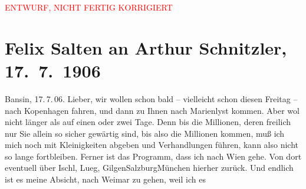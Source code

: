 
\begin{center}
            \textcolor{red}{ENTWURF, NICHT FERTIG KORRIGIERT}
                      \end{center}
            
         
         \renewcommand{\erwaehntePersonen}{Personen: Ottilie Salten, Olga Schnitzler}
         \renewcommand{\erwaehnteOrte}{Orte: Bad Ischl, Bansin, Deutschland, Kopenhagen, Lueg am Wolfgangsee, Marienlyst, München, Salzburg, St. Gilgen, Weimar, Wien}
         \renewcommand{\erwaehnteWerke}{}
               \section[Felix Salten an Arthur Schnitzler, 17. 7. 1906]{ Felix Salten an Arthur Schnitzler, 17. 7. 1906}\nopagebreak{}\rehead{ }\begin{ledgroupsized}[t]{13cm}\normalsize\beginnumbering \toendnotes[C]{\smallbreak\pagebreak[2]} 
\toendnotes[C]{\smallbreak}\pstart
           \raggedleft{}{\pb}Bansin, 17. 7. 06. \pend
           \pstart
           Lieber, wir wollen schon bald – vielleicht schon diesen
                  Freitag – nach Kopenhagen
               fahren, und dann zu Ihnen nach Marienlyst kommen.
               Aber wol nicht länger als auf einen oder zwei Tage. Denn bis die Millionen, deren
               freilich nur Sie allein so sicher gewärtig sind, bis also die Millionen kommen, muß
               ich mich noch mit Kleinigkeiten abgeben und Verhandlungen führen, kann also nicht so
               lange fortbleiben. Ferner ist das Programm, dass ich nach Wien gehe. Von dort eventuell über Ischl, Lueg, GilgenSalzburgMünchen hierher zurück. Und endlich ist es
               meine Absicht, nach Weimar zu gehen, weil ich es

\end{ledgroupsized}
